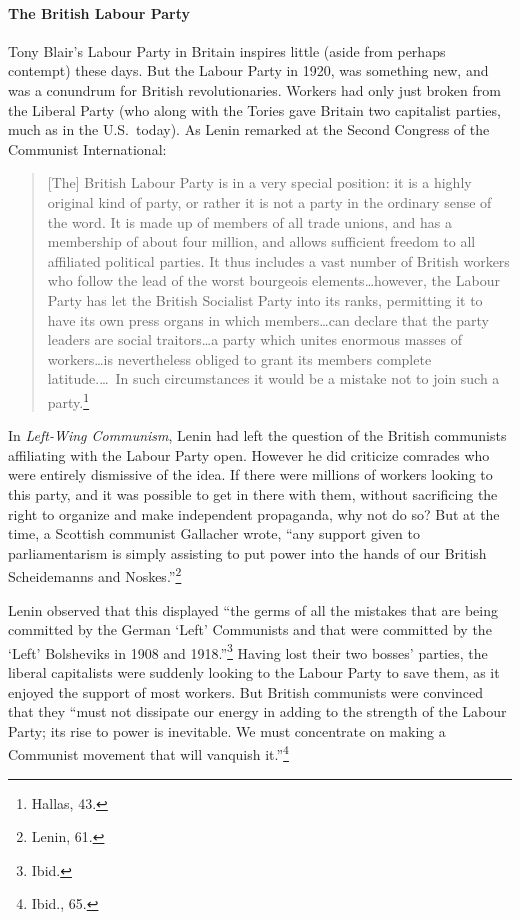 \paragraph{The British Labour Party}

Tony Blair's Labour Party in Britain inspires little (aside from perhaps contempt) these days. But the Labour Party in 1920, was something new, and was a conundrum for British revolutionaries. Workers had only just broken from the Liberal Party (who along with the Tories gave Britain two capitalist parties, much as in the U.S.\ today). As Lenin remarked at the Second Congress of the Communist International:

\blockquote{[The] British Labour Party is in a very special position: it is a highly original kind of party, or rather it is not a party in the ordinary sense of the word. It is made up of members of all trade unions, and has a membership of about four million, and allows sufficient freedom to all affiliated political parties. It thus includes a vast number of British workers who follow the lead of the worst bourgeois elements\ldots however, the Labour Party has let the British Socialist Party into its ranks, permitting it to have its own press organs in which members\ldots can declare that the party leaders are social traitors\ldots a party which unites enormous masses of workers\ldots is nevertheless obliged to grant its members complete latitude.\ldots\ In such circumstances it would be a mistake not to join such a party.\footnote{Hallas, 43.}}

In \emph{Left-Wing Communism}, Lenin had left the question of the British communists affiliating with the Labour Party open. However he did criticize comrades who were entirely dismissive of the idea. If there were millions of workers looking to this party, and it was possible to get in there with them, without sacrificing the right to organize and make independent propaganda, why not do so? But at the time, a Scottish communist Gallacher wrote, ``any support given to parliamentarism is simply assisting to put power into the hands of our British Scheidemanns and Noskes.''\footnote{Lenin, 61.}

Lenin observed that this displayed ``the germs of all the mistakes that are being committed by the German `Left' Communists and that were committed by the `Left' Bolsheviks in 1908 and 1918.''\footnote{Ibid.} Having lost their two bosses' parties, the liberal capitalists were suddenly looking to the Labour Party to save them, as it enjoyed the support of most workers. But British communists were convinced that they ``must not dissipate our energy in adding to the strength of the Labour Party; its rise to power is inevitable. We must concentrate on making a Communist movement that will vanquish it.''\footnote{Ibid., 65.}


